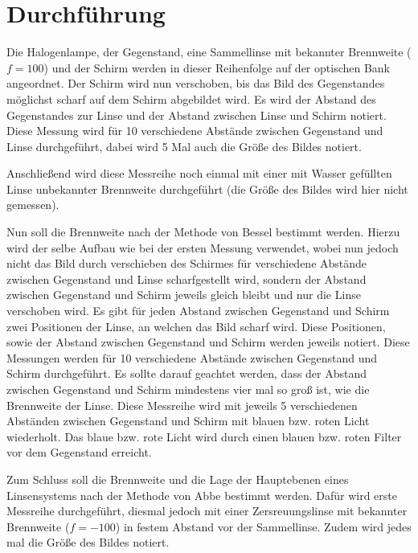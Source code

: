 \section{Durchführung}
\label{sec:Durchführung}

Die Halogenlampe, der Gegenstand, eine Sammellinse mit bekannter Brennweite ($f=100$) und der Schirm werden in dieser Reihenfolge auf der optischen Bank angeordnet. Der Schirm wird nun verschoben, bis das Bild des Gegenstandes möglichst scharf auf dem Schirm abgebildet wird. Es wird der Abstand des Gegenstandes zur Linse und der Abstand zwischen Linse und Schirm notiert. Diese Messung wird für 10 verschiedene Abstände zwischen Gegenstand und Linse durchgeführt, dabei wird 5 Mal auch die Größe des Bildes notiert.

Anschließend wird diese Messreihe noch einmal mit einer mit Wasser gefüllten Linse unbekannter Brennweite durchgeführt (die Größe des Bildes wird hier nicht gemessen).

Nun soll die Brennweite nach der Methode von Bessel bestimmt werden. Hierzu wird der selbe Aufbau wie bei der ersten Messung verwendet, wobei nun jedoch nicht das Bild durch verschieben des Schirmes für verschiedene Abstände zwischen Gegenstand und Linse scharfgestellt wird, sondern der Abstand zwischen Gegenstand und Schirm jeweils gleich bleibt und nur die Linse verschoben wird. Es gibt für jeden Abstand zwischen Gegenstand und Schirm zwei Positionen der Linse, an welchen das Bild scharf wird. Diese Positionen, sowie der Abstand zwischen Gegenstand und Schirm werden jeweils notiert. Diese Messungen werden für 10 verschiedene Abstände zwischen Gegenstand und Schirm durchgeführt. Es sollte darauf geachtet werden, dass der Abstand zwischen Gegenstand und Schirm mindestens vier mal so groß ist, wie die Brennweite der Linse. Diese Messreihe wird mit jeweils 5 verschiedenen Abständen zwischen Gegenstand und Schirm mit blauen bzw. roten Licht wiederholt. Das blaue bzw. rote Licht wird durch einen blauen bzw. roten Filter vor dem Gegenstand erreicht.

Zum Schluss soll die Brennweite und die Lage der Hauptebenen eines Linsensystems nach der Methode von Abbe bestimmt werden. Dafür wird erste Messreihe durchgeführt, diesmal jedoch mit einer Zersreuungslinse mit bekannter Brennweite ($f=-100$) in festem Abstand vor der Sammellinse. Zudem wird jedes mal die Größe des Bildes notiert.
